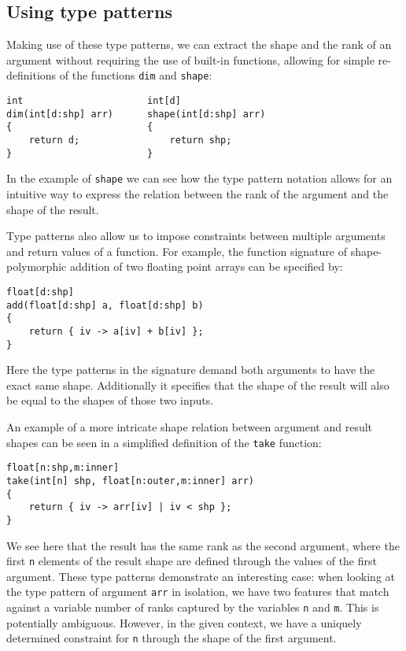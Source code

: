 
\subsection{Using type patterns}\label{sec:examples}

Making use of these type patterns, we can extract the shape and the rank of an argument without requiring the use of built-in functions, allowing for simple re-definitions of the functions \texttt{dim} and \texttt{shape}:
\begin{lstlisting}
int                      int[d]
dim(int[d:shp] arr)      shape(int[d:shp] arr)
{                        {
    return d;                return shp;
}                        }
\end{lstlisting}

\noindent
In the example of \texttt{shape} we can see how the type pattern notation allows for an intuitive way to express the relation between the rank of the argument and the shape of the result.

Type patterns also allow us to impose constraints between multiple arguments and return values of a function.
For example, the function signature of shape-polymorphic addition of two floating point arrays can be specified by:
\begin{lstlisting}
float[d:shp] 
add(float[d:shp] a, float[d:shp] b)
{
    return { iv -> a[iv] + b[iv] };
}
\end{lstlisting}

\noindent
Here the type patterns in the signature demand both arguments to have the exact same shape.
Additionally it specifies that the shape of the result will also be equal to the shapes of those two inputs.

An example of a more intricate shape relation between argument and result shapes can be seen in a simplified definition of the \texttt{take} function:
\begin{lstlisting}
float[n:shp,m:inner]
take(int[n] shp, float[n:outer,m:inner] arr)
{
    return { iv -> arr[iv] | iv < shp };
}
\end{lstlisting}

\noindent
We see here that the result has the same rank as the second argument, where the first \texttt{n} elements of the result shape are defined through the values of the first argument.
These type patterns demonstrate an interesting case: when looking at the type pattern of argument \texttt{arr} in isolation, we have two features that match against a variable number of ranks captured by the variables \texttt{n} and \texttt{m}.
This is potentially ambiguous.
However, in the given context, we have a uniquely determined constraint for \texttt{n} through the shape of the first argument.

